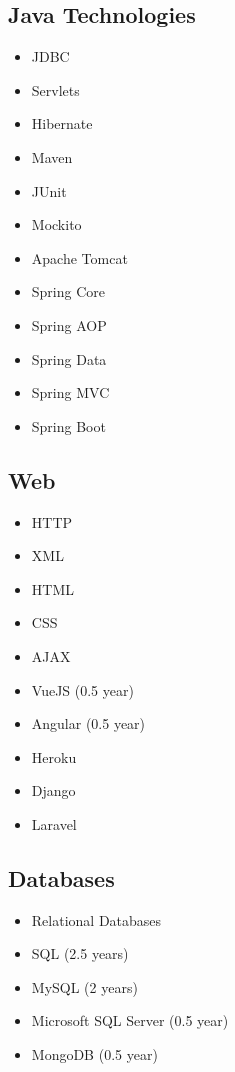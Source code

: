 \documentclass[a4paper,12pt]{article}
\begin{document}
\subsection*{Java Technologies}

\begin{multicols}{3}
\begin{itemize}
    \item JDBC
    \item Servlets
    \item Hibernate
    \item Maven
    \item JUnit
    \item Mockito
    \item Apache Tomcat
    \item Spring Core 
    \item Spring AOP 
    \item Spring Data 
    \item Spring MVC 
    \item Spring Boot 
\end{itemize}
\end{multicols}

\subsection*{Web}

\begin{multicols}{2}
\begin{itemize}
    \item HTTP
    \item XML
    \item HTML
    \item CSS
    \item AJAX
    \item VueJS (0.5 year)
    \item Angular (0.5 year)
    \item Heroku
    \item Django
    \item Laravel 
\end{itemize}
\end{multicols}

\subsection*{Databases}

\begin{multicols}{2}
\begin{itemize}
    \item Relational Databases
    \item SQL (2.5 years)
    \item MySQL (2 years)
    \item Microsoft SQL Server (0.5 year)
    \item MongoDB (0.5 year)
\end{itemize}
\end{multicols}
\end{document}
